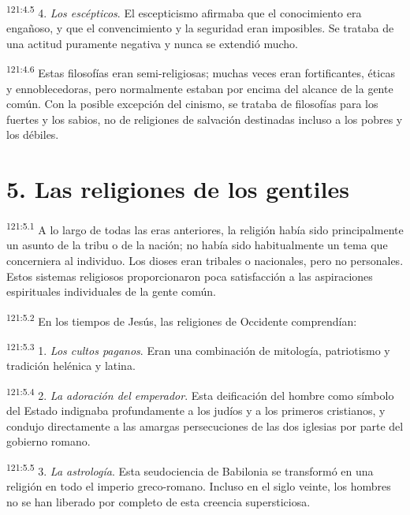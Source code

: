 \par
\textsuperscript{121:4.5} 4. \textit{Los escépticos}. El escepticismo afirmaba que el conocimiento era engañoso, y que el convencimiento y la seguridad eran imposibles. Se trataba de una actitud puramente negativa y nunca se extendió mucho.

\par
\textsuperscript{121:4.6} Estas filosofías eran semi-religiosas; muchas veces eran fortificantes, éticas y ennoblecedoras, pero normalmente estaban por encima del alcance de la gente común. Con la posible excepción del cinismo, se trataba de filosofías para los fuertes y los sabios, no de religiones de salvación destinadas incluso a los pobres y los débiles.

\section*{5. Las religiones de los gentiles}
\par
\textsuperscript{121:5.1} A lo largo de todas las eras anteriores, la religión había sido principalmente un asunto de la tribu o de la nación; no había sido habitualmente un tema que concerniera al individuo. Los dioses eran tribales o nacionales, pero no personales. Estos sistemas religiosos proporcionaron poca satisfacción a las aspiraciones espirituales individuales de la gente común.

\par
\textsuperscript{121:5.2} En los tiempos de Jesús, las religiones de Occidente comprendían:

\par
\textsuperscript{121:5.3} 1. \textit{Los cultos paganos}. Eran una combinación de mitología, patriotismo y tradición helénica y latina.

\par
\textsuperscript{121:5.4} 2. \textit{La adoración del emperador}. Esta deificación del hombre como símbolo del Estado indignaba profundamente a los judíos y a los primeros cristianos, y condujo directamente a las amargas persecuciones de las dos iglesias por parte del gobierno romano.

\par
\textsuperscript{121:5.5} 3. \textit{La astrología}. Esta seudociencia de Babilonia se transformó en una religión en todo el imperio greco-romano. Incluso en el siglo veinte, los hombres no se han liberado por completo de esta creencia supersticiosa.

